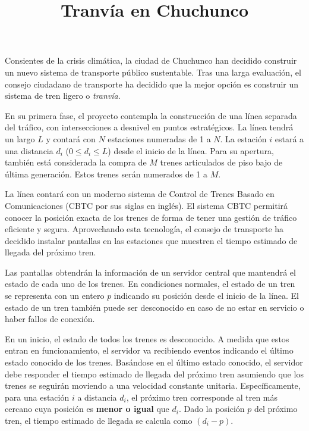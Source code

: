 \documentclass{oci}
\title{Tranvía en Chuchunco}
\begin{document}
\begin{problemDescription}
  Consientes de la crisis climática, la ciudad de Chuchunco
  han decidido construir un nuevo sistema de transporte
  público sustentable.
  Tras una larga evaluación, el consejo ciudadano de
  transporte ha decidido que la mejor opción es construir un
  sistema de tren ligero o \emph{tranvía}.

  En su primera fase, el proyecto contempla la
  construcción de una línea separada del tráfico, con
  intersecciones a desnivel en puntos estratégicos.
  La línea tendrá un largo $L$ y contará con $N$
  estaciones numeradas de 1 a $N$.
  La estación $i$ estará a una distancia $d_i$
  ($0 \leq d_i \leq L$) desde el inicio de la línea.
  Para su apertura, también está considerada la
  compra de $M$ trenes articulados de piso bajo
  de última generación.
  Estos trenes serán numerados de 1 a $M$.

  La línea contará con un moderno sistema de
  Control de Trenes Basado en Comunicaciones
  (CBTC por sus siglas en inglés).
  El sistema CBTC permitirá conocer la posición
  exacta de los trenes de forma de tener una
  gestión de tráfico eficiente y segura.
  Aprovechando esta tecnología, el consejo de
  transporte ha decidido instalar pantallas en las
  estaciones que muestren el tiempo estimado de
  llegada del próximo tren.

  Las pantallas obtendrán la información de un
  servidor central que mantendrá el estado
  de cada uno de los trenes.
  En condiciones normales, el estado de un tren
  se representa con un entero $p$ indicando
  su posición desde el inicio de la línea.
  El estado de un tren también puede ser desconocido
  en caso de no estar en servicio o haber fallos
  de conexión.

  En un inicio, el estado de todos los trenes es
  desconocido.
  A medida que estos entran en funcionamiento, el
  servidor va recibiendo eventos indicando el
  último estado conocido de los trenes.
  Basándose en el último estado conocido, el servidor
  debe responder el tiempo estimado de llegada del
  próximo tren asumiendo que los trenes se seguirán
  moviendo a una velocidad constante unitaria.
  Específicamente, para una estación $i$ a distancia $d_i$,
  el próximo tren corresponde al tren más cercano
  cuya posición es \textbf{menor o igual} que $d_i$.
  Dado la posición $p$ del próximo tren, el tiempo estimado
  de llegada se calcula como $(d_i - p)$.


\end{problemDescription}
\end{document}
